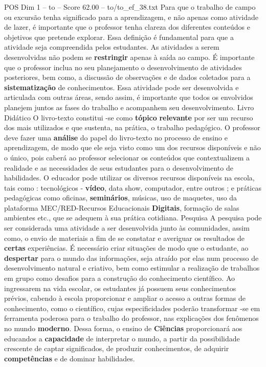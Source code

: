 \begin{textsample}{POS Dim 1 – to – Score 62.00 – to/to\_ef\_38.txt}
Para que o trabalho de campo ou excursão tenha significado para a aprendizagem, e não apenas como atividade de lazer, é importante que o professor tenha clareza dos diferentes conteúdos e objetivos que pretende explorar.
Essa definição é fundamental para que a atividade seja compreendida pelos estudantes.
As atividades a serem desenvolvidas não podem se \textbf{restringir} apenas à saída ao campo.
É importante que o professor inclua no seu planejamento o desenvolvimento de atividades posteriores, bem como, a discussão de observações e de dados coletados para a \textbf{sistematização} de conhecimentos.
Essa atividade pode ser desenvolvida e articulada com outras áreas, sendo assim, é importante que todos os envolvidos planejem juntos as fases do trabalho e acompanhem seu desenvolvimento.
Livro Didático O livro-texto constitui -se como \textbf{tópico} \textbf{relevante} por ser um recurso dos mais utilizados e que sustenta, na prática, o trabalho pedagógico.
O professor deve fazer uma \textbf{análise} do papel do livro-texto no processo de ensino e aprendizagem, de modo que ele seja visto como um dos recursos disponíveis e não o único, pois caberá ao professor selecionar os conteúdos que contextualizem a realidade e as necessidades de seus estudantes para o desenvolvimento de habilidades.
O educador pode utilizar os diversos recursos disponíveis na escola, tais como : tecnológicos - \textbf{vídeo}, data show, computador, entre outros ; e práticas pedagógicas como oficinas, \textbf{seminários}, músicas, uso de maquetes, uso da plataforma MEC/RED-Recursos Educacionais \textbf{Digitais}, formação de salas ambientes etc., que se adequem à sua prática cotidiana.
Pesquisa A pesquisa pode ser considerada uma atividade a ser desenvolvida junto às comunidades, assim como, o envio de materiais a fim de se constatar e averiguar os resultados de \textbf{certas} experiências.
É necessário criar situações de modo que o estudante, ao \textbf{despertar} para o mundo das informações, seja atraído por elas num processo de desenvolvimento natural e criativo, bem como estimular a realização de trabalhos em grupo como desafios para a construção do conhecimento científico.
Ao ingressarem na vida escolar, os estudantes já possuem seus conhecimentos prévios, cabendo à escola proporcionar e ampliar o acesso a outras formas de conhecimento, como o científico, cujas especificidades poderão transformar -se em ferramenta poderosa para o trabalho do professor, nas explicações dos fenômenos no mundo \textbf{moderno}.
Dessa forma, o ensino de \textbf{Ciências} proporcionará aos educandos a \textbf{capacidade} de interpretar o mundo, a partir da possibilidade crescente de captar significados, de produzir conhecimentos, de adquirir \textbf{competências} e de dominar habilidades.

\end{textsample}
